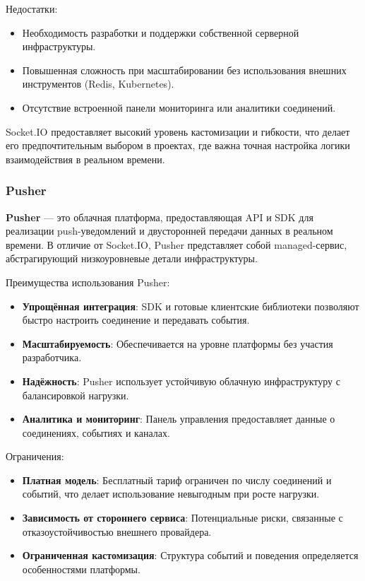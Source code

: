 Недостатки:
\begin{itemize}
    \item Необходимость разработки и поддержки собственной серверной инфраструктуры.
    \item Повышенная сложность при масштабировании без использования внешних инструментов (Redis, Kubernetes).
    \item Отсутствие встроенной панели мониторинга или аналитики соединений.
\end{itemize}

Socket.IO предоставляет высокий уровень кастомизации и гибкости, что делает его предпочтительным выбором в проектах, где важна точная настройка логики взаимодействия в реальном времени.

\subsubsection*{Pusher}

\textbf{Pusher} --- это облачная платформа, предоставляющая API и SDK для реализации push-уведомлений и двусторонней передачи данных в реальном времени. В отличие от Socket.IO, Pusher представляет собой managed-сервис, абстрагирующий низкоуровневые детали инфраструктуры.

Преимущества использования Pusher:
\begin{itemize}
    \item \textbf{Упрощённая интеграция}: SDK и готовые клиентские библиотеки позволяют быстро настроить соединение и передавать события.
    \item \textbf{Масштабируемость}: Обеспечивается на уровне платформы без участия разработчика.
    \item \textbf{Надёжность}: Pusher использует устойчивую облачную инфраструктуру с балансировкой нагрузки.
    \item \textbf{Аналитика и мониторинг}: Панель управления предоставляет данные о соединениях, событиях и каналах.
\end{itemize}

Ограничения:
\begin{itemize}
    \item \textbf{Платная модель}: Бесплатный тариф ограничен по числу соединений и событий, что делает использование невыгодным при росте нагрузки.
    \item \textbf{Зависимость от стороннего сервиса}: Потенциальные риски, связанные с отказоустойчивостью внешнего провайдера.
    \item \textbf{Ограниченная кастомизация}: Структура событий и поведения определяется особенностями платформы.
\end{itemize}

